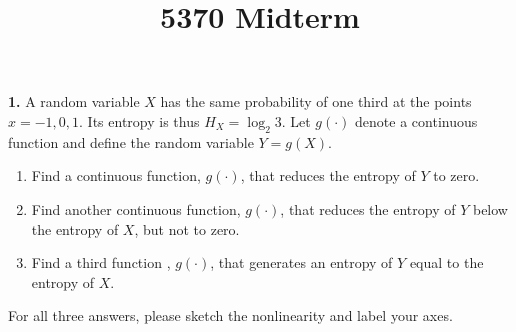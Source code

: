 \documentclass{assignment}
\begin{document}
\title{5370 Midterm}

\textbf{1.} A random variable $X$ has the same probability of one third at the points $x=-1,0,1.$  Its entropy is thus $H_X = \log_2 3.$ Let $g(\cdot) $ denote a continuous function and define the random variable $Y=g(X)$.
\begin{enumerate} \item  Find a continuous function, $g(\cdot )$, that reduces the entropy of $Y$ to zero.
\item  Find another continuous function, $g(\cdot )$, that reduces the entropy of $Y$ below the entropy of $X$, but not to zero.
\item  Find a third function , $g(\cdot )$, that generates an entropy of $Y$ equal to the entropy of $X$.
\end{enumerate}
For all three answers, please sketch the nonlinearity and label your axes.
\end{document}
